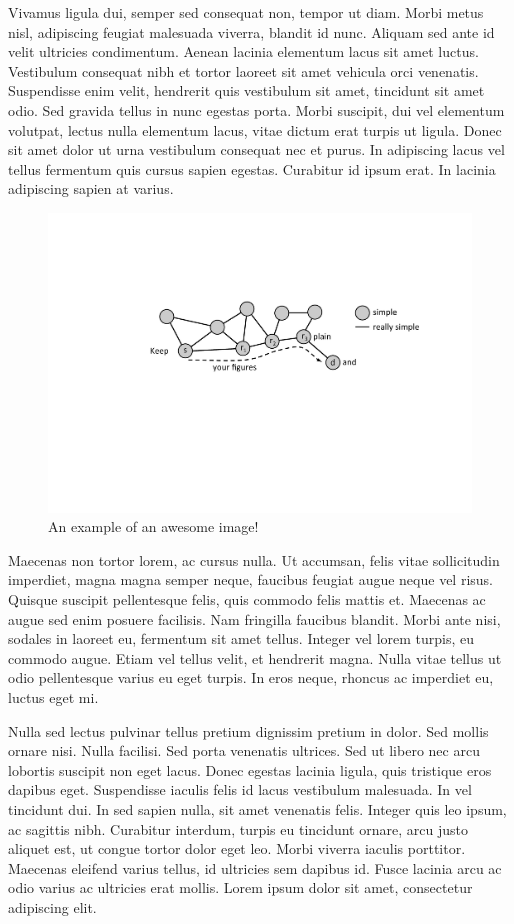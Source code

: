 Vivamus ligula dui, semper sed consequat non, tempor ut diam. Morbi metus nisl, adipiscing feugiat malesuada viverra, blandit id nunc. Aliquam sed ante id velit ultricies condimentum. Aenean lacinia elementum lacus sit amet luctus. Vestibulum consequat nibh et tortor laoreet sit amet vehicula orci venenatis. Suspendisse enim velit, hendrerit quis vestibulum sit amet, tincidunt sit amet odio. Sed gravida tellus in nunc egestas porta. Morbi suscipit, dui vel elementum volutpat, lectus nulla elementum lacus, vitae dictum erat turpis ut ligula. Donec sit amet dolor ut urna vestibulum consequat nec et purus. In adipiscing lacus vel tellus fermentum quis cursus sapien egestas. Curabitur id ipsum erat. In lacinia adipiscing sapien at varius.

\begin{figure}[t]
\centering
\includegraphics[width=1\columnwidth]{figures/example}
\caption{An example of an awesome image!}
\label{fig:example}
\end{figure} 


Maecenas non tortor lorem, ac cursus nulla. Ut accumsan, felis vitae sollicitudin imperdiet, magna magna semper neque, faucibus feugiat augue neque vel risus. Quisque suscipit pellentesque felis, quis commodo felis mattis et. Maecenas ac augue sed enim posuere facilisis. Nam fringilla faucibus blandit. Morbi ante nisi, sodales in laoreet eu, fermentum sit amet tellus. Integer vel lorem turpis, eu commodo augue. Etiam vel tellus velit, et hendrerit magna. Nulla vitae tellus ut odio pellentesque varius eu eget turpis. In eros neque, rhoncus ac imperdiet eu, luctus eget mi.

Nulla sed lectus pulvinar tellus pretium dignissim pretium in dolor. Sed mollis ornare nisi. Nulla facilisi. Sed porta venenatis ultrices. Sed ut libero nec arcu lobortis suscipit non eget lacus. Donec egestas lacinia ligula, quis tristique eros dapibus eget. Suspendisse iaculis felis id lacus vestibulum malesuada. In vel tincidunt dui. In sed sapien nulla, sit amet venenatis felis. Integer quis leo ipsum, ac sagittis nibh. Curabitur interdum, turpis eu tincidunt ornare, arcu justo aliquet est, ut congue tortor dolor eget leo. Morbi viverra iaculis porttitor. Maecenas eleifend varius tellus, id ultricies sem dapibus id. Fusce lacinia arcu ac odio varius ac ultricies erat mollis. Lorem ipsum dolor sit amet, consectetur adipiscing elit. 

